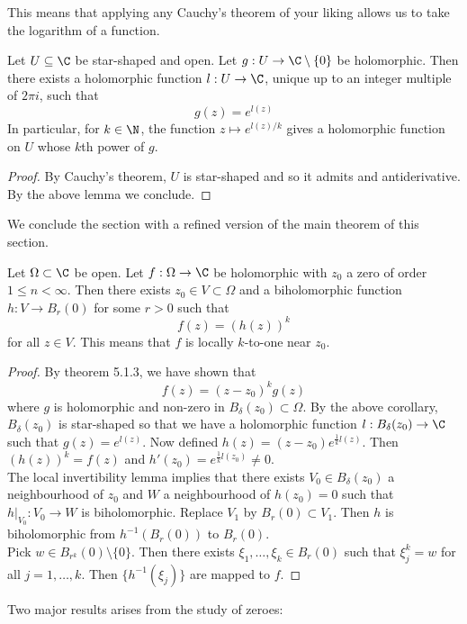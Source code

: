 \documentclass[a4paper]{article}
\begin{document}
This means that applying any Cauchy's theorem of your liking allows us to take the logarithm of a function. 

\begin{crl}{}{} Let $U\subseteq\C$ be star-shaped and open. Let $g:U\to\C\setminus\{0\}$ be holomorphic. Then there exists a holomorphic function $l:U\to\C$, unique up to an integer multiple of $2\pi i$, such that $$g(z)=e^{l(z)}$$ In particular, for $k\in\N$, the function $z\mapsto e^{l(z)/k}$ gives a holomorphic function on $U$ whose $k$th power of $g$. 
\begin{proof}
By Cauchy's theorem, $U$ is star-shaped and so it admits and antiderivative. By the above lemma we conclude. 
\end{proof}
\end{crl}

We conclude the section with a refined version of the main theorem of this section. 

\begin{thm}{}{} Let $\Omega\subset\C$ be open. Let $f:\Omega\to\C$ be holomorphic with $z_0$ a zero of order $1\leq n<\infty$. Then there exists $z_0\in V\subset\Omega$ and a biholomorphic function $h:V\to B_r(0)$ for some $r>0$ such that $$f(z)=\left(h(z)\right)^k$$ for all $z\in V$. This means that $f$ is locally $k$-to-one near $z_0$. 
\begin{proof}
By theorem 5.1.3, we have shown that $$f(z)=(z-z_0)^kg(z)$$ where $g$ is holomorphic and non-zero in $B_\delta(z_0)\subset\Omega$. By the above corollary, $B_\delta(z_0)$ is star-shaped so that we have a holomorphic function $l:B_\delta(z_0)\to\C$ such that $g(z)=e^{l(z)}$. Now defined $h(z)=(z-z_0)e^{\frac{1}{k}l(z)}$. Then $\left(h(z)\right)^k=f(z)$ and $h'(z_0)=e^{\frac{1}{k}l(z_0)}\neq 0$. \\

The local invertibility lemma implies that there exists $V_0\in B_\delta(z_0)$ a neighbourhood of $z_0$ and $W$ a neighbourhood of $h(z_0)=0$ such that $h|_{V_0}:V_0\to W$ is biholomorphic. Replace $V_1$ by $B_r(0)\subset V_1$. Then $h$ is biholomorphic from $h^{-1}(B_r(0))$ to $B_r(0)$. \\

Pick $w\in B_{r^k}(0)\setminus\{0\}$. Then there exists $\xi_1,\dots,\xi_k\in B_r(0)$ such that $\xi_j^k=w$ for all $j=1,\dots,k$. Then $\{h^{-1}(\xi_j)\}$ are mapped to $f$. 
\end{proof}
\end{thm}

Two major results arises from the study of zeroes: 
\end{document}

